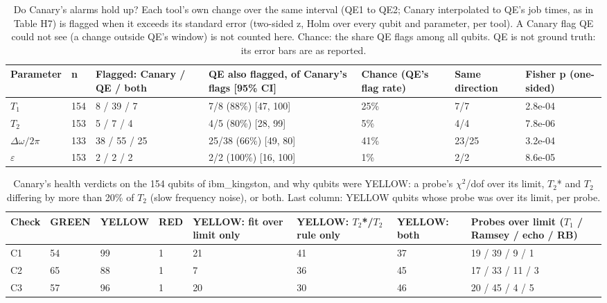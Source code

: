 \begin{table}[!t]
\centering
\footnotesize
\caption{Do Canary's alarms hold up? Each tool's own change over the same interval (QE1 to QE2; Canary interpolated to QE's job times, as in Table H7) is flagged when it exceeds its standard error (two-sided z, Holm over every qubit and parameter, per tool). A Canary flag QE could not see (a change outside QE's window) is not counted here. Chance: the share QE flags among all qubits. QE is not ground truth: its error bars are as reported.}
\label{tab:h8}
\begin{adjustbox}{max width=\linewidth}
\begin{tabular}{lllllll}
\hline
Parameter & n & Flagged: Canary / QE / both & QE also flagged, of Canary's flags [95\% CI] & Chance (QE's flag rate) & Same direction & Fisher p (one-sided) \\
\hline
$T_1$ & 154 & 8 / 39 / 7 & 7/8 (88\%) [47, 100] & 25\% & 7/7 & 2.8e-04 \\
$T_2$ & 153 & 5 / 7 / 4 & 4/5 (80\%) [28, 99] & 5\% & 4/4 & 7.8e-06 \\
$\Delta\omega/2\pi$ & 133 & 38 / 55 / 25 & 25/38 (66\%) [49, 80] & 41\% & 23/25 & 3.2e-04 \\
$\varepsilon$ & 153 & 2 / 2 / 2 & 2/2 (100\%) [16, 100] & 1\% & 2/2 & 8.6e-05 \\
\hline
\end{tabular}
\end{adjustbox}
\end{table}

\begin{table}[!t]
\centering
\footnotesize
\caption{Canary's health verdicts on the 154 qubits of ibm\_kingston, and why qubits were YELLOW: a probe's $\chi$$^2$/dof over its limit, $T_2$* and $T_2$ differing by more than 20\% of $T_2$ (slow frequency noise), or both. Last column: YELLOW qubits whose probe was over its limit, per probe.}
\label{tab:h9}
\begin{adjustbox}{max width=\linewidth}
\begin{tabular}{llllllll}
\hline
Check & GREEN & YELLOW & RED & YELLOW: fit over limit only & YELLOW: $T_2$*/$T_2$ rule only & YELLOW: both & Probes over limit ($T_1$ / Ramsey / echo / RB) \\
\hline
C1 & 54 & 99 & 1 & 21 & 41 & 37 & 19 / 39 / 9 / 1 \\
C2 & 65 & 88 & 1 & 7 & 36 & 45 & 17 / 33 / 11 / 3 \\
C3 & 57 & 96 & 1 & 20 & 30 & 46 & 20 / 45 / 4 / 5 \\
\hline
\end{tabular}
\end{adjustbox}
\end{table}

